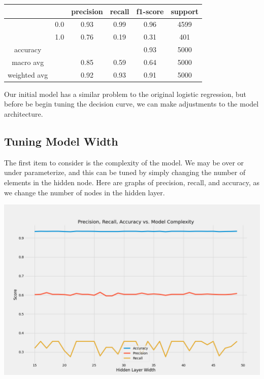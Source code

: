 \documentclass[12pt]{article}
\begin{document}
	\begin{tabular}{c|c|c|c|c|c}
	\hline
	& 		& 	precision &  recall  & f1-score   & support \\ \hline
	
	&  0.0	&		0.93 &     0.99   &  0.96   &  4599 \\ \hline
	&  1.0  &		0.76 &     0.19   &  0.31   &   401 \\ \hline
	
	accuracy    & & & &                       		  0.93   &   5000 \\ \hline
	macro avg   & &   			0.85   &   0.59  &    0.64   &   5000  \\ \hline
	weighted avg  & &   		0.92   &   0.93  &    0.91   &   5000 \\ \hline
	\end{tabular}
	
	Our initial model has a similar problem to the original logistic regression, but before be begin tuning the decision curve, we can make adjustments to the model architecture. 
	
	\subsection{Tuning Model Width}
	
	
	The first item to consider is the complexity of the model. We may be over or under parameterize, and this can be tuned by simply changing the number of elements in the hidden node. Here are graphs of precision, recall, and accuracy, as we change the number of nodes in the hidden layer. 
	
	
	\includegraphics[scale=0.4]{../notebooks/nn_width.png}
	
\end{document}
